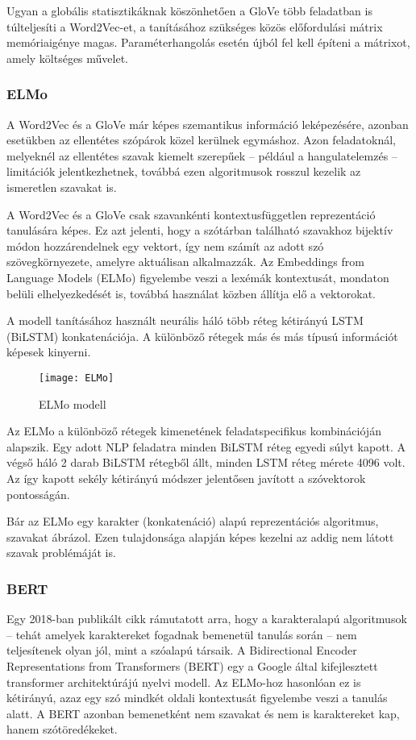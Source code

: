 Ugyan a globális statisztikáknak köszönhetően a GloVe több feladatban is túlteljesíti a Word2Vec-et, a tanításához szükséges közös előfordulási mátrix memóriaigénye magas. Paraméterhangolás esetén újból fel kell építeni a mátrixot, amely költséges művelet.

\subsubsection{ELMo}
A Word2Vec és a GloVe már képes szemantikus információ leképezésére, azonban esetükben az ellentétes szópárok közel kerülnek egymáshoz. Azon feladatoknál, melyeknél az ellentétes szavak kiemelt szerepűek – például a hangulatelemzés – limitációk jelentkezhetnek, továbbá ezen algoritmusok rosszul kezelik az ismeretlen szavakat is.

A Word2Vec és a GloVe csak szavankénti kontextusfüggetlen reprezentáció tanulására képes. Ez azt jelenti, hogy a szótárban található szavakhoz bijektív módon hozzárendelnek egy vektort, így nem számít az adott szó szövegkörnyezete, amelyre aktuálisan alkalmazzák. Az Embeddings from Language Models (ELMo) \cite{elmo} figyelembe veszi a lexémák kontextusát, mondaton belüli elhelyezkedését is, továbbá használat közben állítja elő a vektorokat.

A modell tanításához használt neurális háló több réteg kétirányú LSTM (BiLSTM) konkatenációja. A különböző rétegek más és más típusú információt képesek kinyerni.

\begin{figure}[H]
	\centering
	\texttt{[image: ELMo]}
	\caption{ELMo modell}
\end{figure}

Az ELMo a különböző rétegek kimenetének feladatspecifikus kombinációján alapszik. Egy adott NLP feladatra minden BiLSTM réteg egyedi súlyt kapott. A végső háló 2 darab BiLSTM rétegből állt, minden LSTM réteg mérete 4096 volt.
Az így kapott sekély kétirányú módszer jelentősen javított a szóvektorok pontosságán.

Bár az ELMo egy karakter (konkatenáció) alapú reprezentációs algoritmus, szavakat ábrázol. Ezen tulajdonsága alapján képes kezelni az addig nem látott szavak problémáját is.


\subsubsection{BERT}
Egy 2018-ban publikált cikk \cite{char} rámutatott arra, hogy a karakteralapú algoritmusok – tehát amelyek karaktereket fogadnak bemenetül tanulás során – nem teljesítenek olyan jól, mint a szóalapú társaik. A Bidirectional Encoder Representations from Transformers (BERT) \cite{2018arXiv181004805D} egy a Google által kifejlesztett transformer architektúrájú nyelvi modell. Az ELMo-hoz hasonlóan ez is kétirányú, azaz egy szó mindkét oldali kontextusát figyelembe veszi a tanulás alatt. A BERT azonban bemenetként nem szavakat és nem is karaktereket kap, hanem szótöredékeket.

